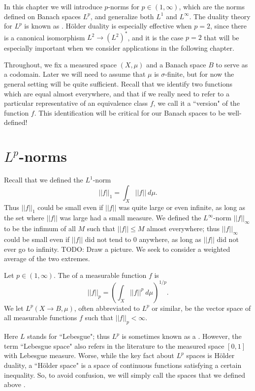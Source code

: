 In this chapter we will introduce $p$-norms for $p \in (1, \infty)$, which are the norms defined on Banach spaces $L^p$, and generalize both $L^1$ and $L^\infty$.
The duality theory for $L^p$ is known as .
H\"older duality is especially effective when $p = 2$, since there is a canonical isomorphism $L^2 \to (L^2)^*$, and it is the case $p = 2$ that will be especially important when we consider applications in the following chapter.

Throughout, we fix a measured space $(X, \mu)$ and a Banach space $B$ to serve as a codomain.
Later we will need to assume that $\mu$ is $\sigma$-finite, but for now the general setting will be quite sufficient.
Recall that we identify two functions which are equal almost everywhere, and that if we really need to refer to a particular representative of an equivalence class $f$, we call it a ``version" of the function $f$.
This identification will be critical for our Banach spaces to be well-defined!

\section{$L^p$-norms}
Recall that we defined the $L^1$-norm
$$||f||_1 = \int_X ||f||~d\mu.$$
Thus $||f||_1$ could be small even if $||f||$ was quite large or even infinite, as long as the set where $||f||$ was large had a small measure.
We defined the $L^\infty$-norm $||f||_\infty$ to be the infimum of all $M$ such that $||f|| \leq M$ almost everywhere; thus $||f||_\infty$ could be small even if $||f||$ did not tend to $0$ anywhere, as long as $||f||$ did not ever go to infinity.
TODO: Draw a picture.
We seek to consider a weighted average of the two extremes.

\begin{definition}
Let $p \in (1, \infty)$.
The  of a measurable function $f$ is
\begin{equation}
\label{Lp definition}
||f||_p = \left(\int_X ||f||^p ~d\mu\right)^{1/p}.
\end{equation}
We let $L^p(X \to B, \mu)$, often abbreviated to $L^p$ or similar, be the vector space of all measurable functions $f$ such that $||f||_p < \infty$.
\end{definition}

Here $L$ stands for ``Lebesgue"; thus $L^p$ is sometimes known as a .
However, the term ``Lebesgue space" also refers in the literature to the measured space $[0, 1]$ with Lebesgue measure.
Worse, while the key fact about $L^p$ spaces is H\"older duality, a ``H\"older space" is a space of continuous functions satisfying a certain inequality.
So, to avoid confusion, we will simply call the spaces that we defined above .

